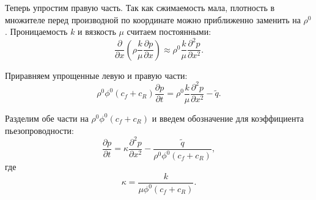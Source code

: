 \documentclass[12pt, a4paper]{article}
\begin{document}
Теперь упростим правую часть. Так как сжимаемость мала, плотность в множителе перед производной по координате можно приближенно заменить на \(\rho^0\). Проницаемость \(k\) и вязкость \(\mu\) считаем постоянными:
\begin{equation}
    \frac{\partial}{\partial x} \left( \rho \frac{k}{\mu} \frac{\partial p}{\partial x} \right) \approx \rho^0 \frac{k}{\mu} \frac{\partial^2 p}{\partial x^2}.
\end{equation}

Приравняем упрощенные левую и правую части:
\begin{equation}
    \rho^0 \phi^0 (c_f + c_R) \frac{\partial p}{\partial t} = \rho^0 \frac{k}{\mu} \frac{\partial^2 p}{\partial x^2} - \tilde{q}.
\end{equation}

Разделим обе части на \(\rho^0 \phi^0 (c_f + c_R)\) и введем обозначение для коэффициента пьезопроводности:
\begin{equation}
    \frac{\partial p}{\partial t} = \kappa \frac{\partial^2 p}{\partial x^2} - \frac{\tilde{q}}{\rho^0 \phi^0 (c_f + c_R)},
\end{equation}
где
\begin{equation}
    \kappa = \frac{k}{\mu \phi^0 (c_f + c_R)}.
\end{equation}





\end{document}
